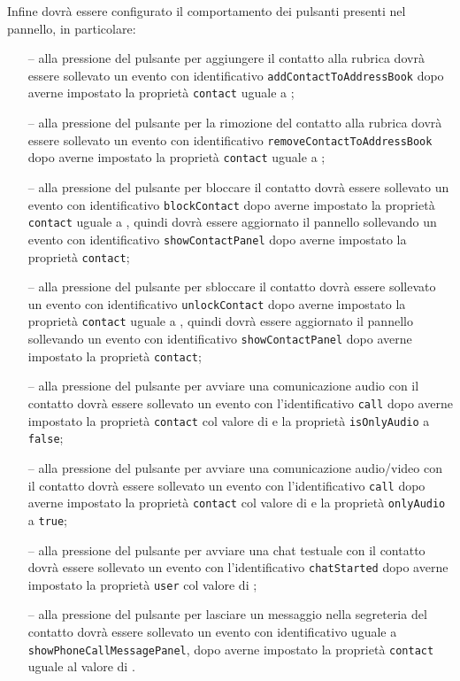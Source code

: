 \begin{description}
  Infine dovrà essere configurato il comportamento dei pulsanti presenti nel pannello, in particolare:
  \begin{itemize}
    \item[--] alla pressione del pulsante per aggiungere il contatto alla rubrica dovrà essere sollevato un evento con identificativo \verb'addContactToAddressBook' dopo averne impostato la proprietà \verb'contact' uguale a ;
    \item[--] alla pressione del pulsante per la rimozione del contatto alla rubrica dovrà essere sollevato un evento con identificativo \verb'removeContactToAddressBook' dopo averne impostato la proprietà \verb'contact' uguale a ;
    \item[--] alla pressione del pulsante per bloccare il contatto dovrà essere sollevato un evento con identificativo \verb'blockContact' dopo averne impostato la proprietà \verb'contact' uguale a , quindi dovrà essere aggiornato il pannello sollevando un evento con identificativo \verb'showContactPanel' dopo averne impostato la proprietà \verb'contact';
    \item[--] alla pressione del pulsante per sbloccare il contatto dovrà essere sollevato un evento con identificativo \verb'unlockContact' dopo averne impostato la proprietà \verb'contact' uguale a , quindi dovrà essere aggiornato il pannello sollevando un evento con identificativo \verb'showContactPanel' dopo averne impostato la proprietà \verb'contact';
    \item[--] alla pressione del pulsante per avviare una comunicazione audio con il contatto dovrà essere sollevato un evento con l'identificativo \verb'call' dopo averne impostato la proprietà \verb'contact' col valore di  e la proprietà \verb'isOnlyAudio' a \verb'false';
    \item[--] alla pressione del pulsante per avviare una comunicazione audio/video con il contatto dovrà essere sollevato un evento con l'identificativo \verb'call' dopo averne impostato la proprietà \verb'contact' col valore di  e la proprietà \verb'onlyAudio' a \verb'true';
    \item[--] alla pressione del pulsante per avviare una chat testuale con il contatto dovrà essere sollevato un evento con l'identificativo \verb'chatStarted' dopo averne impostato la proprietà \verb'user' col valore di ;
    \item[--] alla pressione del pulsante per lasciare un messaggio nella segreteria del contatto dovrà essere sollevato un evento con identificativo uguale a \verb'showPhoneCallMessagePanel', dopo averne impostato la proprietà \verb'contact' uguale al valore di .
  \end{itemize}
  

\end{description}
